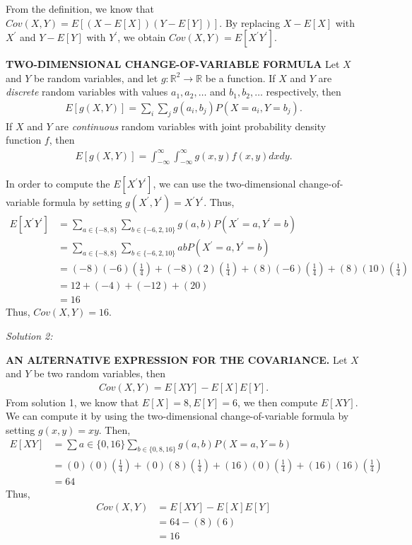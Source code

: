 \documentclass{article} %
\begin{document}
From the definition, we know that $Cov(X, Y) = E\left[ \left(X - E[X]\right)\left(Y - E[Y]\right)\right]$. By replacing $X - E[X]$ with $X^\prime$ and $Y - E[Y]$ with $Y^\prime$, we obtain $Cov(X, Y) = E[X^\prime Y^\prime]$. 

{\bf TWO-DIMENSIONAL CHANGE-OF-VARIABLE FORMULA} 
Let $X$ and $Y$ be random variables, and let $g: \mathbb{R}^2 \rightarrow \mathbb{R}$ be a function. If $X$ and $Y$ are {\it discrete} random variables with values $a_1, a_2, \ldots$ and $b_1, b_2, \ldots$ respectively, then 
\begin{align*}
E\left[g\left(X, Y\right)\right] = \sum_i \sum_j g(a_i, b_j) P(X = a_i, Y = b_j) .
\end{align*}
If $X$ and $Y$ are {\it continuous} random variables with joint probability density function $f$, then 
\begin{align*}
E\left[g\left(X, Y\right) \right] = \int_{-\infty}^{\infty} \int_{-\infty}^{\infty} g(x, y) f(x, y) dx dy.
\end{align*}

In order to compute the $E[X^\prime Y^\prime]$, we can use the two-dimensional change-of-variable formula by setting $g(X^\prime, Y^\prime) = X^\prime Y^\prime$. Thus, 
\begin{align*}
E\left[X^\prime Y^\prime\right] &= \sum_{a \in \{-8, 8\}} \sum_{b \in \{-6, 2, 10\}} g( a, b) P(X^\prime = a, Y^\prime = b)  \\
& = \sum_{a \in \{-8, 8\}} \sum_{b \in \{-6, 2, 10\}}  abP(X^\prime = a, Y^\prime = b)\\
& =  (-8)(-6)(\frac{1}{4}) + (-8)(2)(\frac{1}{4}) + (8)(-6)(\frac{1}{4}) + (8)(10)(\frac{1}{4}) \\
& = 12 + (-4) + (-12) + (20) \\
& = 16
\end{align*}
Thus, $Cov(X, Y) = 16$. 

{\it Solution 2:}

{\bf AN ALTERNATIVE EXPRESSION FOR THE COVARIANCE.} Let $X$ and $Y$ be two random variables, then 
\begin{align*}
Cov(X, Y) = E[XY] - E[X]E[Y]. 
\end{align*}
From solution 1, we know that $E[X] = 8, E[Y] = 6$, we then compute $E[XY]$. We can compute it by using the two-dimensional change-of-variable formula by setting $g(x, y) = xy$. Then,
\begin{align}
E[XY] & = \sum{a \in \{0, 16\}} \sum_{b \in \{0, 8, 16\}} g(a, b) P(X =a, Y = b) \\
& = (0)(0)(\frac{1}{4}) + (0)(8)(\frac{1}{4}) + (16)(0)(\frac{1}{4}) + (16)(16)(\frac{1}{4}) \\
& = 64 
\end{align}
Thus, 
\begin{align*}
Cov(X, Y) & = E[XY] - E[X]E[Y] \\
& = 64 - (8)(6) \\
& = 16
\end{align*}
\end{document}
